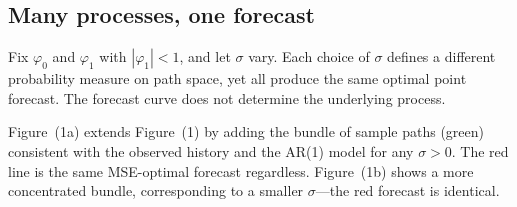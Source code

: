 \documentclass[a4paper,oneside,12pt]{extarticle}
\theoremstyle{plain}
\theoremstyle{definition}
\theoremstyle{remark}
\begin{document}
\subsection{Many processes, one forecast}

Fix $\varphi_0$ and $\varphi_1$ with $|\varphi_1|<1$, and let $\sigma$
vary. Each choice of $\sigma$ defines a different probability measure on
path space, yet all produce the same optimal point forecast. The forecast
curve does not determine the underlying process.

Figure~(1a) extends Figure~(1) by adding the bundle of sample paths
(green) consistent with the observed history and the AR(1) model for any
$\sigma>0$. The red line is the same MSE-optimal forecast regardless.
Figure~(1b) shows a more concentrated bundle, corresponding to a smaller
$\sigma$---the red forecast is identical.
\end{document}
